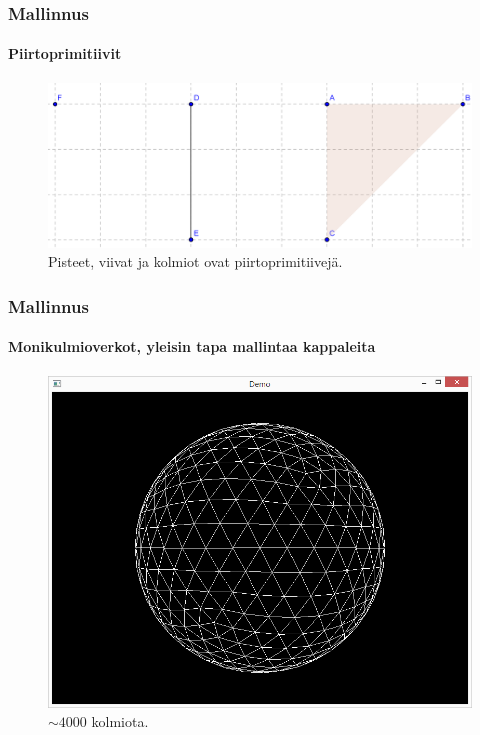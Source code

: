 \documentclass{beamer}
\begin{document}
\begin{frame}
\frametitle{Mallinnus}
\framesubtitle{Piirtoprimitiivit}
\begin{figure}
\includegraphics[scale=0.5]{img/primitives.png}
\caption{Pisteet, viivat ja kolmiot ovat piirtoprimitiivejä.}
\end{figure}
\end{frame}

\begin{frame}
\frametitle{Mallinnus}
\framesubtitle{Monikulmioverkot, yleisin tapa mallintaa kappaleita}
\begin{figure}
\includegraphics[scale=0.3]{img/sphere_wf.png}
\caption{$\sim4000$ kolmiota.}
\end{figure}
\end{frame}
\end{document}
